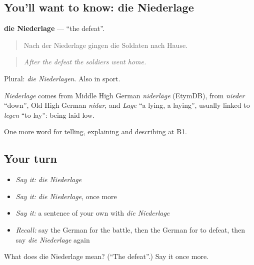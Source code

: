 \subsection*{You'll want to know: die Niederlage}
\textbf{die Niederlage} — \textquotedblleft{}the defeat\textquotedblright{}.

\begin{quote}
Nach der Niederlage gingen die Soldaten nach Hause.
\end{quote}

\begin{quote}
\emph{After the defeat the soldiers went home.}
\end{quote}

Plural: \emph{die Niederlagen}. Also in sport.

\begin{cousinweb}
\emph{Niederlage} comes from Middle High German \emph{niderlāge} (EtymDB), from \emph{nieder} \textquotedblleft{}down\textquotedblright{}, Old High German \emph{nidar}, and \emph{Lage} \textquotedblleft{}a lying, a laying\textquotedblright{}, usually linked to \emph{legen} \textquotedblleft{}to lay\textquotedblright{}: being laid low.
\end{cousinweb}

\begin{grammarlens}[title={What you've built}]
One more word for telling, explaining and describing at B1.
\end{grammarlens}

\subsection*{Your turn}
\begin{itemize}
\raggedright
  \item \emph{Say it:} \emph{die Niederlage}
  \item \emph{Say it:} \emph{die Niederlage}, once more
  \item \emph{Say it:} a sentence of your own with \emph{die Niederlage}
  \item \emph{Recall:} say the German for the battle, then the German for to defeat, then say \emph{die Niederlage} again
\end{itemize}

\begin{tcolorbox}[breakable,colback=teal!4,colframe=teal!35!black,title={Before you move on}]
What does die Niederlage mean? (\textquotedblleft{}The defeat\textquotedblright{}.) Say it once more.
\end{tcolorbox}
